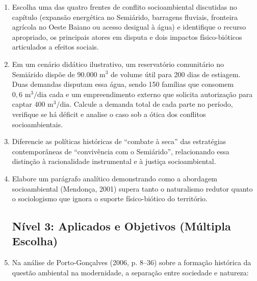 \begin{enumerate}[leftmargin=1.8em, itemsep=4pt]
  \item Escolha uma das quatro frentes de conflito socioambiental discutidas no capítulo (expansão energética no Semiárido, barragens fluviais, fronteira agrícola no Oeste Baiano ou acesso desigual à água) e identifique o recurso apropriado, os principais atores em disputa e dois impactos físico-bióticos articulados a efeitos sociais.
  \espacoResolucao[1.8cm]

  \item Em um cenário didático ilustrativo, um reservatório comunitário no Semiárido dispõe de $90.000\text{ m}^3$ de volume útil para 200 dias de estiagem. Duas demandas disputam essa água, sendo 150 famílias que consomem $0{,}6\text{ m}^3/\text{dia}$ cada e um empreendimento externo que solicita autorização para captar $400\text{ m}^3/\text{dia}$. Calcule a demanda total de cada parte no período, verifique se há déficit e analise o caso sob a ótica dos conflitos socioambientais.
  \espacoResolucao[1.8cm]

  \item Diferencie as políticas históricas de ``combate à seca'' das estratégias contemporâneas de ``convivência com o Semiárido'', relacionando essa distinção à racionalidade instrumental e à justiça socioambiental.
  \espacoResolucao[1.8cm]

  \item Elabore um parágrafo analítico demonstrando como a abordagem socioambiental (Mendonça, 2001) supera tanto o naturalismo redutor quanto o sociologismo que ignora o suporte físico-biótico do território.
  \espacoResolucao[1.8cm]

\subsection*{Nível 3: Aplicados e Objetivos (Múltipla Escolha)}

  \item Na análise de Porto-Gonçalves (2006, p. 8--36) sobre a formação histórica da questão ambiental na modernidade, a separação entre sociedade e natureza:
  \espacoResolucao[1.8cm]


\end{enumerate}
